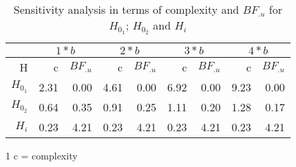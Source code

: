 \documentclass[
  english,
  man]{apa6}
\begin{document}
\FloatBarrier 
\begin{table}[ht]

\centering

\caption{Sensitivity analysis in terms of complexity and $BF_{.u}$ for $H_{0_1}$; $H_{0_2}$ and $H_{i}$}

\label{t3}

\begin{tabular}{r|rr|rr|rr|rr}

\hline

& \multicolumn{2}{c|}{$ 1 * b$} & \multicolumn{2}{c|}{$2 * b$} & \multicolumn{2}{c|}{$3 * b$} & \multicolumn{2}{c}{$4 * b$} \\

\hline

H  & c & $BF_{.u}$  & c & $BF_{.u}$  & c & $BF_{.u}$ & c & $BF_{.u}$ \\

\hline

$H_{0_1}$ & 2.31 & 0.00 & 4.61 & 0.00 & 6.92 & 0.00 & 9.23 & 0.00 \\

$H_{0_2}$ & 0.64 & 0.35 & 0.91 & 0.25 & 1.11 & 0.20 & 1.28 & 0.17 \\

$H_{i}$   & 0.23 & 4.21 & 0.23 & 4.21 & 0.23 & 4.21 & 0.23 & 4.21 \\

\hline

\end{tabular}

\begin{tablenotes}

\item[1] c = complexity

\end{tablenotes}

\end{table}
\FloatBarrier

\begingroup
\setlength{\parindent}{-0.5in}
\setlength{\leftskip}{0.5in}
\end{document}

